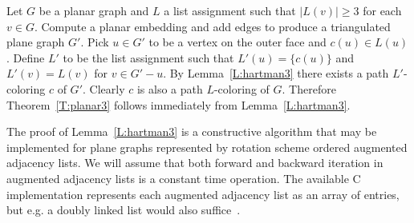 \documentclass[12pt,letterpaper]{article}
\theoremstyle{plain}
\theoremstyle{definition}
\theoremstyle{break}
\begin{document}
Let $G$ be a planar graph and $L$ a list assignment such
that $|L(v)|\ge 3$ for each $v\in G$. Compute a planar embedding and add edges
to produce a triangulated plane graph $G'$. Pick $u\in G'$ to be a vertex
on the outer face and $c(u)\in L(u)$. Define $L'$ to be the list
assignment such that $L'(u)=\{c(u)\}$ and $L'(v)=L(v)$ for $v\in G'-u$.
By Lemma~\ref{L:hartman3} there exists a path $L'$-coloring $c$ of $G'$.
Clearly $c$ is also a path $L$-coloring of $G$.
Therefore Theorem~\ref{T:planar3} follows immediately from 
Lemma~\ref{L:hartman3}.

The proof of Lemma~\ref{L:hartman3} is a constructive algorithm that may be
implemented for plane graphs represented by
rotation scheme ordered augmented adjacency lists.
We will assume that both forward and backward iteration in augmented adjacency
lists
is a constant time operation.
The
available C implementation represents each augmented adjacency list as an array
of entries, but e.g. a doubly linked list would also suffice~\cite{Bro2017}.
\end{document}
